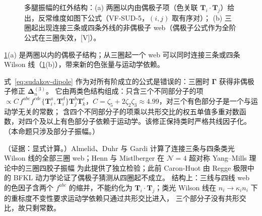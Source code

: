 \begin{figure}[htbp]
\caption{多腿振幅的红外结构：(a) 两圈以内由偶极子项（色关联 $\mathbf T_i\cdot\mathbf T_j$）给出，反常维度如图下公式（VF-SUD-5，$(i,j)$ 取有序对）；
(b) 三圈起出现连接三条或四条外线的非偶极子 web（偶极子公式作为全阶公式在三圈失效，[V]）。}
\label{fig:sudakov-dipole}
\end{figure}

\cref{fig:sudakov-dipole}(a) 是两圈以内的偶极子结构；从三圈起一个 web 可以同时连接三条或四条 Wilson 线（\cref{fig:sudakov-dipole}(b)），带来新的色张量与运动学依赖。

\begin{proposition}\label{prop:sudakov-dipole-violation}
式~\eqref{eq:sudakov-dipole} 作为对所有阶成立的公式是错误的：三圈时 $\boldsymbol\Gamma$ 获得非偶极子修正 $\boldsymbol\Delta^{(3)}_n$。
它由两类色结构组成：只含三个不同部分子的项 $\propto C\,f^{abe}f^{cde}\{\mathbf T_i^a,\mathbf T_i^d\}\mathbf T_j^b\mathbf T_k^c$，$C=\zeta_5+2\zeta_2\zeta_3\approx4.99$，对三个有色部分子是一个与运动学无关的常数；
含四个不同部分子的项乘以共形交比的权五单值多重对数函数，对四个及以上有色部分子依赖于运动学。该修正保持类时严格共线因子化\cite[式~(7)、(13)、(14)、(17)]{Almelid:2015jia}。
（本命题只涉及部分子振幅。）
\end{proposition}

\begin{proofsketch}
（证据：显式计算。）Almelid、Duhr 与 Gardi 计算了连接三条与四条类光 Wilson 线的全部三圈 web\cite{Almelid:2015jia}；Henn 与 Mistlberger 在 $\mathcal N=4$ 超对称 Yang--Mills 理论中的三圈四胶子振幅
为此提供了独立检验\cite{Henn:2016jdu}；此前 Caron-Huot 由 Regge 极限中的 BFKL 动力学论证了偶极子猜测从四圈起不成立\cite[第~4.3~节，式~(4.28)]{Caron-Huot:2013fea}。
结构上：三线与四线 web 的色因子含两个 $f^{abc}$ 的缩并，不能约化为 $\mathbf T_i\cdot\mathbf T_j$；类光 Wilson 线在 $n_i\to\kappa_in_i$ 下的重标度不变性要求运动学依赖只通过共形交比进入，
三个部分子没有共形交比，故只剩常数。
\end{proofsketch}

